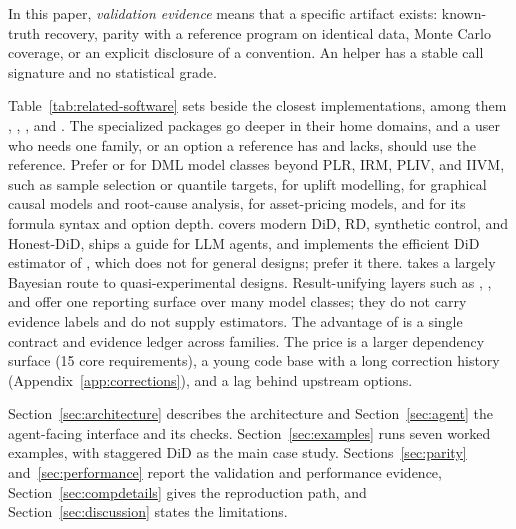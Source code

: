 In this paper, \emph{validation evidence} means that a specific artifact
exists: known-truth recovery, parity with a reference program on identical
data, Monte Carlo coverage, or an explicit disclosure of a convention. An
 helper has a stable call signature and no statistical
grade.



Table~\ref{tab:related-software} sets \statspai{} beside the closest
implementations, among them  \citep{pyfixest2025pyfixest},
 \citep{econml},  \citep{chen2020causalml}, and
 \citep{sharma2020dowhy}. The specialized packages go deeper in their home
domains, and a user who needs one family, or an option a reference has
and \statspai{} lacks, should use the reference. Prefer  or  for DML model classes beyond PLR, IRM,
PLIV, and IIVM, such as sample selection or quantile targets,  for
uplift modelling,  for graphical causal models and root-cause
analysis,  for asset-pricing models, and  for its
formula syntax and option depth.  \citep{gerber2026diffdiff}
covers modern DiD, RD, synthetic control, and Honest-DiD, ships a guide for LLM
agents, and implements the efficient DiD estimator of \citet{chen2025efficient},
which \statspai{} does not for general designs; prefer it there.
 \citep{pymclabs2026causalpy} takes a largely Bayesian route to
quasi-experimental designs. Result-unifying layers such as 
\citep{robinson2026broom}, 
\citep{arelbundock2022modelsummary}, and 
\citep{arelbundock2024marginaleffects} offer one reporting surface over
many  model classes; they do not carry evidence labels and do
not supply estimators. The advantage of \statspai{} is a single contract
and evidence ledger across families. The price is a larger dependency surface (15 core
requirements), a young code base with a long correction history
(Appendix~\ref{app:corrections}), and a lag behind upstream options.

Section~\ref{sec:architecture} describes the architecture and
Section~\ref{sec:agent} the agent-facing interface and its checks.
Section~\ref{sec:examples} runs seven worked examples, with staggered
DiD as the main case study. Sections~\ref{sec:parity}
and~\ref{sec:performance} report the validation and performance evidence,
Section~\ref{sec:compdetails} gives the reproduction path, and
Section~\ref{sec:discussion} states the limitations.
